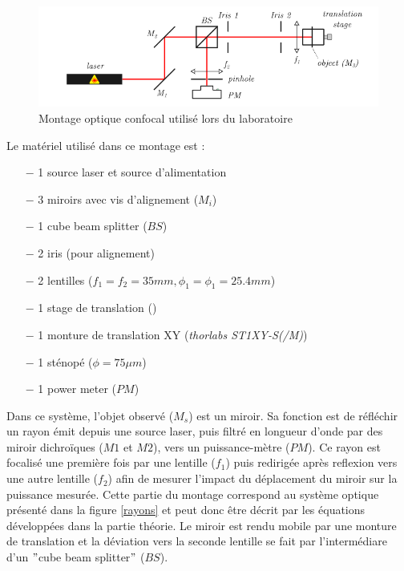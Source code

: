 \documentclass[11pt,letterpaper]{article}
\begin{document}
\begin{figure}[H]
  \centering
  \includegraphics[scale=0.7]{Montage laboratoire 1.png}
  \caption{Montage optique confocal utilisé lors du laboratoire}
  \label{montage}
\end{figure}

Le matériel utilisé dans ce montage est :

\begin{itemize}
    \item[$-$]  1 source laser et source d’alimentation
    \item[$-$]  3 miroirs avec vis d’alignement ($M_i$)
    \item[$-$]  1 cube beam splitter ($BS$)
    \item[$-$]  2 iris (pour alignement)
    \item[$-$]  2 lentilles ($f_1 = f_2 = 35 mm, \phi_1 = \phi_1 = 25.4 mm$)
    \item[$-$]  1 stage de translation ()
    \item[$-$]  1 monture de translation XY (\textit{thorlabs ST1XY-S(/M)})
    \item[$-$]  1 sténopé ($\phi = 75μm$)
    \item[$-$]  1 power meter ($PM$)
\end{itemize}

Dans ce système, l'objet observé ($M_s$) est un miroir. Sa fonction est de réfléchir un rayon émit depuis une source laser, puis filtré en longueur d'onde par des miroir dichroïques ($M1$ et $M2$), vers un puissance-mètre ($PM$). Ce rayon est focalisé une première fois par une lentille ($f_1$) puis redirigée après reflexion vers une autre lentille ($f_2$) afin de mesurer l'impact du déplacement du miroir sur la puissance mesurée. Cette partie du montage correspond au système optique présenté dans la figure \ref{rayons} et peut donc être décrit par les équations développées dans la partie théorie. Le miroir est rendu mobile par une monture de translation et la déviation vers la seconde lentille se fait par l'intermédiare d'un $"$cube beam splitter$"$ ($BS$). \\
\end{document}
